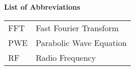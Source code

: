 \noindent\Large{\bf{List of Abbreviations}}

\vspace{24pt}

\small\normalsize

\begin{supertabular}{ll}
FFT & Fast Fourier Transform\\
PWE & Parabolic Wave Equation\\
RF & Radio Frequency\\
\end{supertabular}

